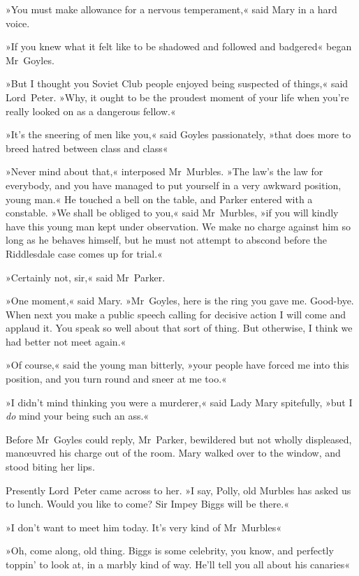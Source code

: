 »You must make allowance for a nervous temperament,« said Mary in a hard voice.

»If you knew what it felt like to be shadowed and followed and badgered\longdash« began Mr~Goyles.

»But I thought you Soviet Club people enjoyed being suspected of things,« said Lord~Peter. »Why, it ought to be the proudest moment of your life when you're really looked on as a dangerous fellow.«

»It's the sneering of men like you,« said Goyles passionately, »that does more to breed hatred between class and class\longdash«

»Never mind about that,« interposed Mr~Murbles. »The law's the law for everybody, and you have managed to put yourself in a very awkward position, young man.« He touched a bell on the table, and Parker entered with a constable. »We shall be obliged to you,« said Mr~Murbles, »if you will kindly have this young man kept under observation. We make no charge against him so long as he behaves himself, but he must not attempt to abscond before the Riddlesdale case comes up for trial.«

»Certainly not, sir,« said Mr~Parker.

»One moment,« said Mary. »Mr~Goyles, here is the ring you gave me.  Good-bye. When next you make a public speech calling for decisive action I will come and applaud it. You speak so well about that sort of thing. But otherwise, I think we had better not meet again.«

»Of course,« said the young man bitterly, »your people have forced me into this position, and you turn round and sneer at me too.«

»I didn't mind thinking you were a murderer,« said Lady Mary spitefully, »but I \textit{do} mind your being such an ass.«

Before Mr~Goyles could reply, Mr~Parker, bewildered but not wholly displeased, manœuvred his charge out of the room. Mary walked over to the window, and stood biting her lips.

Presently Lord~Peter came across to her. »I say, Polly, old Murbles has asked us to lunch. Would you like to come? Sir Impey Biggs will be there.«

»I don't want to meet him today. It's very kind of Mr~Murbles\longdash«

»Oh, come along, old thing. Biggs is some celebrity, you know, and perfectly toppin' to look at, in a marbly kind of way. He'll tell you all about his canaries\longdash«

